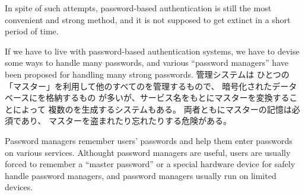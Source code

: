 \documentclass{article}
\begin{document}

In spite of such attempts,
password-based authentication is still the most
convenient and strong method\cite{Bonneau},
and it is not supposed to get extinct
in a short period of time\cite{Herley:2009:PSS:1601990.1602010}.



If we have to live with password-based authentication systems,
we have to devise some ways to handle many passwords, and
various ``password managers'' have been proposed
for handling many strong passwords.
%
{\PW}管理システムは
ひとつの「マスター{\PW}」を利用して他のすべての{\PW}を管理するもので、
暗号化されたデータベースに{\PW}を格納するもの%
\cite{OnePassword}%
\cite{Dashlane}%
\cite{ミルパス}%
\cite{LastPass}%
\cite{KeyPass}%
\cite{NortonIDSafe}%
\cite{IDManager}%
が多いが、サービス名をもとにマスター{\PW}を変換することによって
複数の{\PW}を生成するシステム\cite{SuperGenPass}もある。
両者ともにマスター{\PW}の記憶は必須であり、
マスター{\PW}を盗まれたり忘れたりする危険がある。

Password managers remember users' passwords and help them enter
passwords on various services.
Althought password managers are useful,
users are usually forced to remember a ``master password''
or a special hardware device
for safely handle password managers, and
password managers usually run on limited devices.


%
\end{document}
